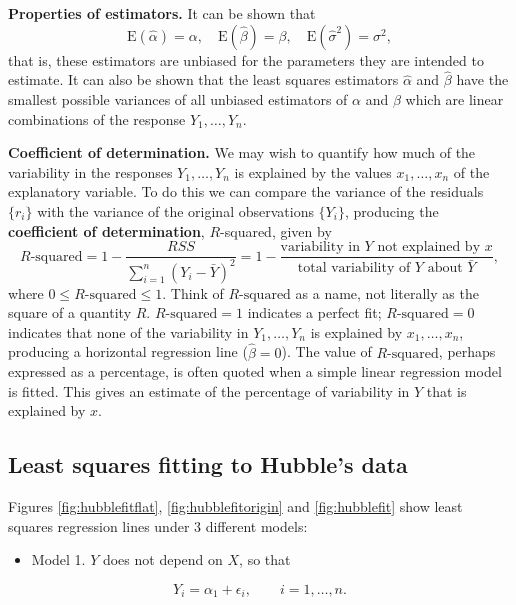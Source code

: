 \documentclass[
  british,
  11pt,
  openany, a4paper]{book}
\providecommand{\tightlist}{%
  \setlength{\itemsep}{0pt}\setlength{\parskip}{0pt}}
\begin{document}
\textbf{Properties of estimators.} It can be shown that
\[  \text{E}(\hat{\alpha})=\alpha, \quad  \text{E}(\hat{\beta})=\beta, \quad  \text{E}(\hat{\sigma}^2)=\sigma^2, \]
that is, these estimators are unbiased for the parameters they are intended to estimate. It can also be shown that the least squares estimators \(\hat{\alpha}\) and \(\hat{\beta}\) have the smallest possible variances of all unbiased estimators of \(\alpha\) and \(\beta\) which are linear combinations of the response \(Y_1,\ldots,Y_n\).

\textbf{Coefficient of determination.} We may wish to quantify how much of the variability in the responses \(Y_1,\ldots,Y_n\) is explained by the values \(x_1,\ldots,x_n\) of the explanatory variable. To do this we can compare the variance of the residuals \(\{r_i\}\) with the variance of the original observations \(\{Y_i\}\), producing the \textbf{coefficient of determination}, \(R\)-squared, given by
\[ R\text{-squared} = 1- \frac{RSS}{\displaystyle\sum_{i=1}^n \left(Y_i-\bar{Y}\right)^2} 
= 1-\frac{\text{variability in $Y$ not explained by $x$}}
{\text{total variability of $Y$ about $\bar{Y}$}}, \]
where \(0 \leq R\text{-squared} \leq 1\). Think of \(R\text{-squared}\) as a name, not literally as the square of a quantity \(R\). \(R\text{-squared}=1\) indicates a perfect fit; \(R\text{-squared}=0\) indicates that none of the variability in \(Y_1,\ldots,Y_n\) is explained by \(x_1,\ldots,x_n\), producing a horizontal regression line (\(\hat{\beta}=0\)). The value of \(R\text{-squared}\), perhaps expressed as a percentage, is often quoted when a simple linear regression model is fitted. This gives an estimate of the percentage of variability in \(Y\) that is explained by \(x\).

\subsection{Least squares fitting to Hubble's data}\label{least-squares-fitting-to-hubbles-data}

Figures \ref{fig:hubblefitflat}, \ref{fig:hubblefitorigin} and \ref{fig:hubblefit} show least squares regression lines under 3 different models:

\begin{itemize}
\tightlist
\item
  Model 1. \(Y\) does not depend on \(X\), so that
\end{itemize}

\[ Y_i = \alpha_1 + \epsilon_i, \qquad i=1,\ldots, n. \]
\end{document}
